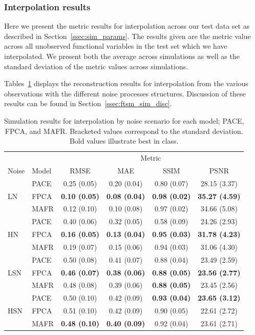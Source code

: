 \subsubsection{Interpolation results}
Here we present the metric results for interpolation across our test data set as described in Section~\ref{ssec:sim_params}.
The results given are the metric value across all unobserved functional variables in the test set which we have interpolated.
We present both the average across simulations as well as the standard deviation of the metric values across simulations.

Tables~\ref{tab:ftsm_sim_interp} displays the reconstruction results for interpolation from the various observations with the different noise processes structures. 
Discussion of these results can be found in Section~\ref{ssec:ftsm_sim_disc}. 

\begin{table}[htbp!] 
	\caption[Simulation results for interpolation by noise scenario with the three models under consideration.]{Simulation results for interpolation by noise scenario for each model; PACE, FPCA, and MAFR. Bracketed values correspond to the standard deviation. Bold values illustrate best in class.}
	\centering
	\label{tab:ftsm_sim_interp}
	\begin{tabular}{l l c c c c}
		\toprule
		& & \multicolumn{4}{c}{Metric} \\ 
		Noise & Model & RMSE & MAE & SSIM & PSNR \\
		\midrule
		\multirow{3}{*}{LN}& PACE & 0.25 (0.05) & 0.20 (0.04) & 0.80 (0.07) & 28.15 (3.37) \\
		& FPCA  & \textbf{0.10 (0.05)} & \textbf{0.08 (0.04)} & \textbf{0.98 (0.02)} & \textbf{35.27 (4.59)} \\
		& MAFR  & 0.12 (0.10) & 0.10 (0.08) & 0.97 (0.02)  & 34.66 (5.08) \\
		\midrule
		\multirow{3}{*}{HN} & PACE & 0.40 (0.06) & 0.32 (0.05) & 0.58 (0.09) & 24.26 (2.93) \\
		& FPCA  & \textbf{0.16 (0.05)} & \textbf{0.13 (0.04)} & \textbf{0.95 (0.03)} & \textbf{31.78 (4.23)} \\
		& MAFR  & 0.19 (0.07) & 0.15 (0.06) & 0.94 (0.03)  & 31.06 (4.30) \\
		\midrule
		\multirow{3}{*}{LSN} & PACE & 0.50 (0.08) & 0.41 (0.07) & 0.88 (0.04) & 23.49 (2.59) \\
		& FPCA  & \textbf{0.46 (0.07)} & \textbf{0.38 (0.06)} & \textbf{0.88 (0.05)} & \textbf{23.56 (2.77)} \\
		& MAFR  & 0.48 (0.08) & 0.39 (0.06) & \textbf{0.88 (0.05)}  & 23.45 (2.56)\\
		\midrule
		\multirow{3}{*}{HSN} & PACE & 0.50 (0.10) & 0.42 (0.09) & \textbf{0.93 (0.04)} & \textbf{23.65 (3.12)}  \\
		& FPCA  & 0.51 (0.10) & 0.42 (0.09) & 0.90 (0.05) & 22.61 (2.72) \\
		& MAFR  & \textbf{0.48 (0.10)} & \textbf{0.40 (0.09)} & 0.92 (0.04) & 23.61 (2.71) \\
		\bottomrule
	\end{tabular}
\end{table}

